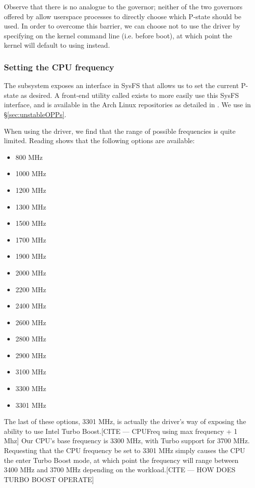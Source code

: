 Observe that there is no analogue to the  governor; neither of
the two governors offered by  allow userspace processes to
directly choose which P-state should be used. In order to overcome this barrier,
we can choose not to use the  driver by specifying
 on the kernel command line (i.e. before boot),
at which point the kernel will default to using  instead.

\subsubsection{Setting the CPU frequency}

The  subsystem exposes an interface in SysFS that allows us to
set the current P-state as desired. A front-end utility called 
exists to more easily use this SysFS interface, and is available in the Arch
Linux repositories as detailed in \cite{archFrequency}. We use 
in §\ref{sec:unstableOPPs}.

When using the  driver, we find that the range of possible
frequencies is quite limited. Reading  shows that the
following options are available:
\begin{itemize}
    \item 800 MHz
    \item 1000 MHz
    \item 1200 MHz
    \item 1300 MHz
    \item 1500 MHz
    \item 1700 MHz
    \item 1900 MHz
    \item 2000 MHz
    \item 2200 MHz
    \item 2400 MHz
    \item 2600 MHz
    \item 2800 MHz
    \item 2900 MHz
    \item 3100 MHz
    \item 3300 MHz
    \item 3301 MHz
\end{itemize}

The last of these options, 3301 MHz, is actually the driver's way of exposing
the ability to use Intel Turbo Boost.[CITE — CPUFreq using max frequency + 1 Mhz]
Our CPU's base frequency is 3300 MHz,
with Turbo support for 3700 MHz. Requesting that the CPU frequency be set to
3301 MHz simply causes the CPU the enter Turbo Boost mode, at which point the
frequency will range between 3400 MHz and 3700 MHz depending on the
workload.[CITE — HOW DOES TURBO BOOST OPERATE]
